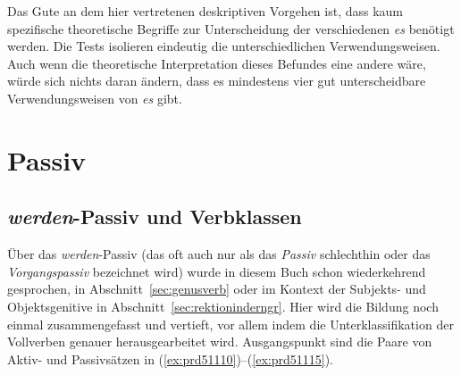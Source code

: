 Das Gute an dem hier vertretenen deskriptiven Vorgehen ist, dass kaum spezifische theoretische Begriffe zur Unterscheidung der verschiedenen \textit{es} benötigt werden.
Die Tests isolieren eindeutig die unterschiedlichen Verwendungsweisen.
Auch wenn die theoretische Interpretation dieses Befundes eine andere wäre, würde sich nichts daran ändern, dass es mindestens vier gut unterscheidbare Verwendungsweisen von \textit{es} gibt.




\section{Passiv}

\label{sec:passiv}

\subsection{\textit{werden}-Passiv und Verbklassen}

\label{sec:werdenpassiv}


Über das \textit{werden}-Passiv (das oft auch nur als das \textit{Passiv} schlechthin oder das \textit{Vorgangspassiv} bezeichnet wird) wurde in diesem Buch schon wiederkehrend gesprochen, \zB in Abschnitt~\ref{sec:genusverb} oder im Kontext der Subjekts- und Objektsgenitive in Abschnitt~\ref{sec:rektioninderngr}.
Hier wird die Bildung noch einmal zusammengefasst und vertieft, vor allem indem die Unterklassifikation der Vollverben genauer herausgearbeitet wird.
Ausgangspunkt sind die Paare von Aktiv- und Passivsätzen in (\ref{ex:prd51110})--(\ref{ex:prd51115}).

\newcommand{\Lab}[1]{\ensuremath{_{\mathrm{#1}}}}

